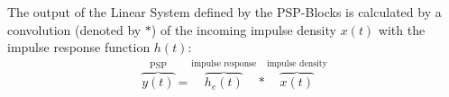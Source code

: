 The output of the Linear System defined by the PSP-Blocks is calculated by a convolution (denoted by $\ast$) of the
incoming impulse density $x(t)$ with the impulse response function $h(t)$:\\
\begin{align}
    \overbrace{y(t)}^{\text{PSP}} = \overbrace{h_e(t)}^{\text{impulse response}} \ast \overbrace{x(t)}^{\text{impulse density}} \label{eq:convolution}
\end{align}
